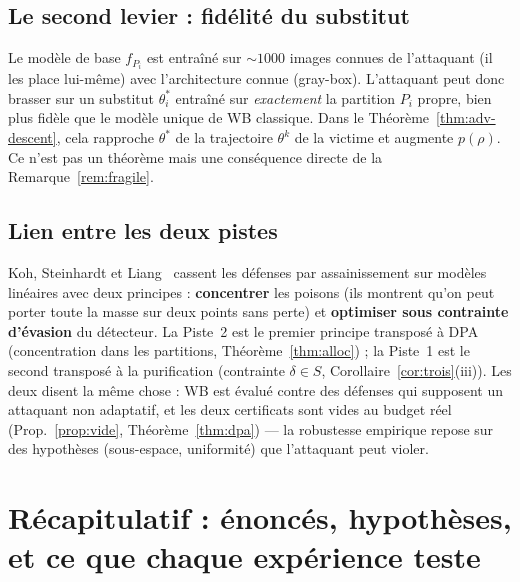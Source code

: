 \documentclass[11pt,a4paper]{article}
\theoremstyle{plain}
\theoremstyle{definition}
\theoremstyle{remark}
\begin{document}
\subsection{Le second levier : fidélité du substitut}

Le modèle de base $f_{P_i}$ est entraîné sur $\sim1000$ images connues de l'attaquant (il les
place lui-même) avec l'architecture connue (gray-box). L'attaquant peut donc brasser sur un
substitut $\theta^*_i$ entraîné sur \emph{exactement} la partition $P_i$ propre, bien plus fidèle
que le modèle unique de WB classique. Dans le Théorème~\ref{thm:adv-descent}, cela rapproche
$\theta^*$ de la trajectoire $\theta^k$ de la victime et augmente $p(\rho)$. Ce n'est pas un
théorème mais une conséquence directe de la Remarque~\ref{rem:fragile}.

\subsection{Lien entre les deux pistes}

Koh, Steinhardt et Liang~\cite{koh2022} cassent les défenses par assainissement sur modèles
linéaires avec deux principes : \textbf{concentrer} les poisons (ils montrent qu'on peut porter
toute la masse sur deux points sans perte) et \textbf{optimiser sous contrainte d'évasion} du
détecteur. La Piste~2 est le premier principe transposé à DPA (concentration dans les partitions,
Théorème~\ref{thm:alloc}) ; la Piste~1 est le second transposé à la purification (contrainte
$\delta\in S$, Corollaire~\ref{cor:trois}(iii)). Les deux disent la même chose : WB est évalué
contre des défenses qui supposent un attaquant non adaptatif, et les deux certificats sont vides
au budget réel (Prop.~\ref{prop:vide}, Théorème~\ref{thm:dpa}) --- la robustesse empirique repose
sur des hypothèses (sous-espace, uniformité) que l'attaquant peut violer.

\section{Récapitulatif : énoncés, hypothèses, et ce que chaque expérience teste}
\end{document}
